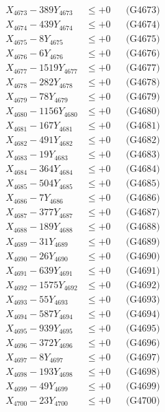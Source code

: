 \documentclass[a4paper,10pt]{article}
\begin{document}
{\begin{align}
X_{4673} - 389Y_{4673} &\leq +0 && \text{(G4673)} \\
X_{4674} - 439Y_{4674} &\leq +0 && \text{(G4674)} \\
X_{4675} - 8Y_{4675} &\leq +0 && \text{(G4675)} \\
X_{4676} - 6Y_{4676} &\leq +0 && \text{(G4676)} \\
X_{4677} - 1519Y_{4677} &\leq +0 && \text{(G4677)} \\
X_{4678} - 282Y_{4678} &\leq +0 && \text{(G4678)} \\
X_{4679} - 78Y_{4679} &\leq +0 && \text{(G4679)} \\
X_{4680} - 1156Y_{4680} &\leq +0 && \text{(G4680)} \\
\allowbreak
X_{4681} - 167Y_{4681} &\leq +0 && \text{(G4681)} \\
X_{4682} - 491Y_{4682} &\leq +0 && \text{(G4682)} \\
X_{4683} - 19Y_{4683} &\leq +0 && \text{(G4683)} \\
X_{4684} - 364Y_{4684} &\leq +0 && \text{(G4684)} \\
X_{4685} - 504Y_{4685} &\leq +0 && \text{(G4685)} \\
X_{4686} - 7Y_{4686} &\leq +0 && \text{(G4686)} \\
X_{4687} - 377Y_{4687} &\leq +0 && \text{(G4687)} \\
X_{4688} - 189Y_{4688} &\leq +0 && \text{(G4688)} \\
X_{4689} - 31Y_{4689} &\leq +0 && \text{(G4689)} \\
X_{4690} - 26Y_{4690} &\leq +0 && \text{(G4690)} \\
\allowbreak
X_{4691} - 639Y_{4691} &\leq +0 && \text{(G4691)} \\
X_{4692} - 1575Y_{4692} &\leq +0 && \text{(G4692)} \\
X_{4693} - 55Y_{4693} &\leq +0 && \text{(G4693)} \\
X_{4694} - 587Y_{4694} &\leq +0 && \text{(G4694)} \\
X_{4695} - 939Y_{4695} &\leq +0 && \text{(G4695)} \\
X_{4696} - 372Y_{4696} &\leq +0 && \text{(G4696)} \\
X_{4697} - 8Y_{4697} &\leq +0 && \text{(G4697)} \\
X_{4698} - 193Y_{4698} &\leq +0 && \text{(G4698)} \\
X_{4699} - 49Y_{4699} &\leq +0 && \text{(G4699)} \\
X_{4700} - 23Y_{4700} &\leq +0 && \text{(G4700)} \\

\end{align}}
\end{document}
